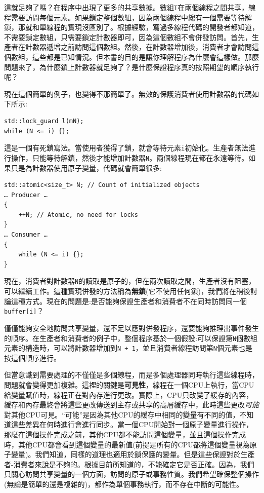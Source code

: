 這就足夠了嗎？在程序中出現了更多的共享數據。數組\texttt{T}在兩個線程之間共享，線程需要訪問每個元素。如果鎖定整個數組，因為兩個線程中總有一個需要等待解鎖，那就和單線程的實現沒區別了。根據經驗，寫過多線程代碼的開發者都知道，不需要鎖定數組，只需要鎖定計數器即可，因為這個數組不會併發訪問。首先，生產者在計數器遞增之前訪問這個數組。然後，在計數器增加後，消費者才會訪問這個數組，這些都是已知情況。但本書的目的是讓你理解程序為什麼會這樣做。那麼問題來了，為什麼鎖上計數器就足夠了？是什麼保證程序真的按照期望的順序執行呢？

現在這個簡單的例子，也變得不那簡單了。無效的保護消費者使用計數器的代碼如下所示:

\begin{lstlisting}[style=styleCXX]
std::lock_guard l(mN);
while (N <= i) {};
\end{lstlisting}

這是一個有死鎖寫法。當使用者獲得了鎖，就會等待元素\texttt{i}初始化。生產者無法進行操作，只能等待解鎖，然後才能增加計數器\texttt{N}。兩個線程現在都在永遠等待。如果只是為計數器使用原子變量，代碼就會簡單很多:

\begin{lstlisting}[style=styleCXX]
std::atomic<size_t> N; // Count of initialized objects
… Producer …
{
	++N; // Atomic, no need for locks
}
… Consumer …
{
	while (N <= i) {};
}
\end{lstlisting}

現在，消費者對計數器\texttt{N}的讀取是原子的，但在兩次讀取之間，生產者沒有阻塞，可以繼續工作。這種實現併發的方法稱為\textbf{無鎖}(它不使用任何鎖)，我們將在稍後討論這種方式。現在的問題是:是否能夠保證生產者和消費者不在同時訪問同一個\texttt{buffer[i]}？


僅僅能夠安全地訪問共享變量，還不足以應對併發程序，還要能夠推理出事件發生的順序。在生產者和消費者的例子中，整個程序基於一個假設:可以保證第\texttt{N}個數組元素的構造時，可以將計數器增加到\texttt{N + 1}，並且消費者線程訪問第\texttt{N}個元素也是按這個順序進行。

但當意識到需要處理的不僅僅是多個線程，而是多個處理器同時執行這些線程時，問題就會變得更加複雜。這裡的關鍵是\textbf{可見性}，線程在一個CPU上執行，當CPU給變量賦值時，線程正在對內存進行更改。實際上，CPU只改變了緩存的內容，緩存和內存最終會將這些更改傳送到主存或共享的高層緩存中，此時這些更改\textit{可能}對其他CPU可見。“可能”是因為其他CPU的緩存中相同的變量有不同的值，不知道這些差異在何時進行會進行同步。當一個CPU開始對一個原子變量進行操作，那麼在這個操作完成之前，其他CPU都不能訪問這個變量，並且這個操作完成時，其他CPU都會看到這個變量的最新值(前提是所有的CPU都將這個變量視為原子變量)。我們知道，同樣的道理也適用於鎖保護的變量。但是這些保證對於生產者-消費者來說是不夠的。根據目前所知道的，不能確定它是否正確。因為，我們只關心訪問共享變量的一個方面，訪問的原子或事務性質。我們希望確保整個操作(無論是簡單的還是複雜的)，都作為單個事務執行，而不存在中斷的可能性。

